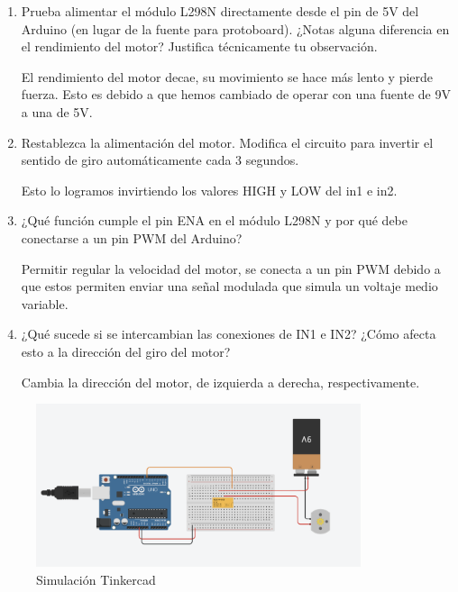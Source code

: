 \documentclass{article}
\begin{document}
\begin{enumerate}
    \item Prueba alimentar el módulo L298N directamente desde el pin de 5V del Arduino (en lugar de la fuente para protoboard). ¿Notas alguna diferencia en el rendimiento del motor? Justifica técnicamente tu observación.

    El rendimiento del motor decae, su movimiento se hace más lento y pierde fuerza. Esto es debido a que hemos cambiado de operar con una fuente de 9V a una de 5V.
        
    \item Restablezca la alimentación del motor. Modiﬁca el circuito para invertir el sentido de giro automáticamente cada 3 segundos.

    Esto lo logramos invirtiendo los valores HIGH y LOW del in1 e in2.
    
    \item ¿Qué función cumple el pin ENA en el módulo L298N y por qué debe conectarse a un pin PWM del Arduino?

    Permitir regular la velocidad del motor, se conecta a un pin PWM debido a que estos permiten enviar una señal modulada que simula un voltaje medio variable. 
    
    \item ¿Qué sucede si se intercambian las conexiones de IN1 e IN2? ¿Cómo afecta esto a la dirección del giro del motor?

    Cambia la dirección del motor, de izquierda a derecha, respectivamente.
\end{enumerate}

\begin{figure}[H]
    \centering
    \includegraphics[width=0.85\textwidth]{./img/simulacion_puenteh.png}
    \caption{Simulación Tinkercad}
    \label{fig:motor_driver}
\end{figure}
\end{document}
